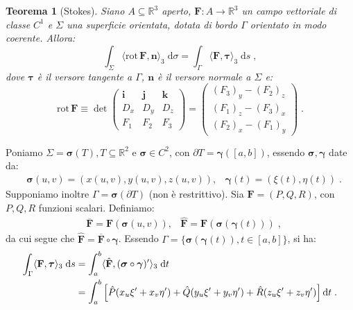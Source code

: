 \documentclass[a4paper,12pt]{report}
\theoremstyle{plain}
\newtheorem{thm}{Teorema}[section]
\theoremstyle{definition}
\theoremstyle{remark}
\newcommand{\Rot}{\mathrm{rot}\,}
\newcommand{\ov}[1]{\overline{#1}}
\newcommand{\BF}[1]{\boldsymbol{#1}}
\newcommand{\diff}[1]{\mathrm{d}#1}
\numberwithin{equation}{section}
\begin{document}
\begin{thm}[Stokes] Siano $A\subseteq\mathbb{R}^3$ aperto, $\mathbf{F}:A\to\mathbb{R}^3$ un campo vettoriale di classe $C^1$ e $\Sigma$ una superficie orientata, dotata di bordo $\Gamma$ orientato in modo coerente. Allora:
\begin{equation}
\int_{\Sigma} \langle \Rot \mathbf{F},\mathbf{n}\rangle_3\;\diff{\sigma}=\int_{\Gamma} \langle\mathbf{F},\BF{\tau}\rangle_3\;\diff{s}\;,
\end{equation}
dove $\BF{\tau}$ è il versore tangente a $\Gamma$, $\mathbf{n}$ è il versore normale a $\Sigma$ e:
\begin{equation}
\Rot \mathbf{F}\equiv \det\left(\begin{matrix}
                            \mathbf{i} & \mathbf{j} & \mathbf{k} \\
D_x & D_y & D_z \\
F_1 & F_2 & F_3
                           \end{matrix}\right)=\left(\begin{matrix}
(F_3)_y-(F_2)_z \\
(F_1)_z-(F_3)_x \\
(F_2)_x-(F_1)_y
\end{matrix}\right)\;.
\end{equation}
\end{thm}
\proof Poniamo $\Sigma=\BF{\sigma}(T),T\subseteq \mathbb{R}^2$ e $\BF{\sigma}\in C^2$, con $\partial T=\BF{\gamma}([a,b])$, essendo $\BF{\sigma},\BF{\gamma}$ date da:
\begin{align}
&\BF{\sigma}(u,v)=\left(x(u,v),y(u,v),z(u,v)\right), &\BF{\gamma}(t)=\left(\xi(t),\eta(t)\right)\;.
\end{align}
Supponiamo inoltre $\Gamma=\BF{\sigma}(\partial T)$ (non è restrittivo). Sia $\mathbf{F}=(P,Q,R)$, con $P,Q,R$ funzioni scalari. 
Definiamo:
\begin{align}
&\overline{\mathbf{F}}=\mathbf{F}(\BF{\sigma}(u,v)), &\hat{\mathbf{F}}=\mathbf{F}(\BF{\sigma}(\BF{\gamma}(t)))\;,
\end{align}
da cui segue che $\hat{\mathbf{F}}=\ov{\mathbf{F}}\circ \BF{\gamma}$. Essendo $\Gamma=\{\BF{\sigma}(\BF{\gamma}(t)),t\in [a,b]\}$, si ha:
\begin{align}
\int_{\Gamma}\langle\mathbf{F},\BF{\tau}\rangle_3\;\diff{s} &=\int_a^b\langle\hat{\mathbf{F}},(\BF{\sigma}\circ\BF{\gamma})'\rangle_3\;\diff{t}\notag \\
&=\int_a^b\left[\hat{P}(x_u\xi'+x_v\eta')+\hat{Q}(y_u\xi'+y_v\eta')+\hat{R}(z_u\xi'+z_v\eta')\right]\diff{t} \label{ch8_stokes}\;.
\end{align}
\end{document}
